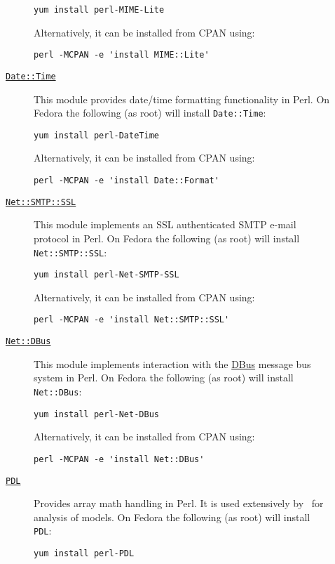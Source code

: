 \begin{description}
\begin{description}
\begin{verbatim}
yum install perl-MIME-Lite
\end{verbatim}
Alternatively, it can be installed from CPAN using:
\begin{verbatim}
perl -MCPAN -e 'install MIME::Lite'
\end{verbatim}
  \item [\href{http://search.cpan.org/~gbarr/TimeDate-1.20/lib/Date/Format.pm}{{\tt Date::Time}}] This module provides date/time formatting functionality in Perl. On Fedora the following (as root) will install {\tt Date::Time}:
\begin{verbatim}
yum install perl-DateTime
\end{verbatim}
Alternatively, it can be installed from CPAN using:
\begin{verbatim}
perl -MCPAN -e 'install Date::Format'
\end{verbatim}
  \item [\href{http://search.cpan.org/~cwest/Net-SMTP-SSL-1.01/lib/Net/SMTP/SSL.pm}{{\tt Net::SMTP::SSL}}] This module implements an SSL authenticated SMTP e-mail protocol in Perl. On Fedora the following (as root) will install {\tt Net::SMTP::SSL}:
\begin{verbatim}
yum install perl-Net-SMTP-SSL
\end{verbatim}
Alternatively, it can be installed from CPAN using:
\begin{verbatim}
perl -MCPAN -e 'install Net::SMTP::SSL'
\end{verbatim}
  \item [\href{http://search.cpan.org/~danberr/Net-DBus-0.33.6/lib/Net/DBus.pm}{{\tt Net::DBus}}] This module implements interaction with the \href{http://www.freedesktop.org/wiki/Software/dbus}{DBus} message bus system in Perl. On Fedora the following (as root) will install {\tt Net::DBus}:
\begin{verbatim}
yum install perl-Net-DBus
\end{verbatim}
Alternatively, it can be installed from CPAN using:
\begin{verbatim}
perl -MCPAN -e 'install Net::DBus'
\end{verbatim}
  \item [\href{http://pdl.perl.org/}{{\tt PDL}}] Provides array math handling in Perl. It is used extensively by \glc\ for analysis of models. On Fedora the following (as root) will install {\tt PDL}:
\begin{verbatim}
yum install perl-PDL
\end{verbatim}

\end{description}
\end{description}
